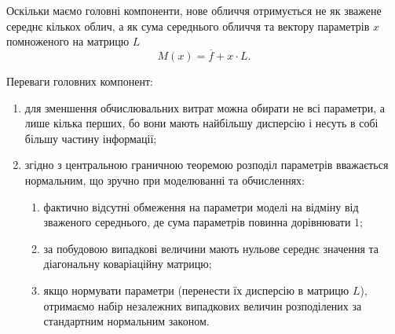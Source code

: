 Оскільки маємо головні компоненти,
нове обличчя отримується не як зважене середнє кількох облич,
а як сума середнього обличчя та вектору параметрів $x$
помноженого на матрицю $L$
\begin{equation*}
  M\left( x \right) = \overline{f} + x \cdot L.
\end{equation*}

Переваги головних компонент:
\begin{enumerate}
  \item для зменшення обчислювальних витрат можна обирати не всі параметри,
    а лише кілька перших,
    бо вони мають найбільшу дисперсію
    і несуть в собі більшу частину інформації;
  \item згідно з центральною граничною теоремою
    розподіл параметрів вважається нормальним,
      що зручно при моделюванні та обчисленнях:
  \begin{enumerate}
    \item фактично відсутні обмеження на параметри моделі на відміну від
      зваженого середнього, де сума параметрів повинна дорівнювати $1$;
    \item за побудовою випадкові величини мають нульове середнє значення
      та діагональну коваріаційну матрицю;
    \item якщо нормувати параметри (перенести їх дисперсію в матрицю $L$),
      отримаємо набір незалежних випадкових величин
      розподілених за стандартним нормальним законом.
  \end{enumerate}
\end{enumerate}
